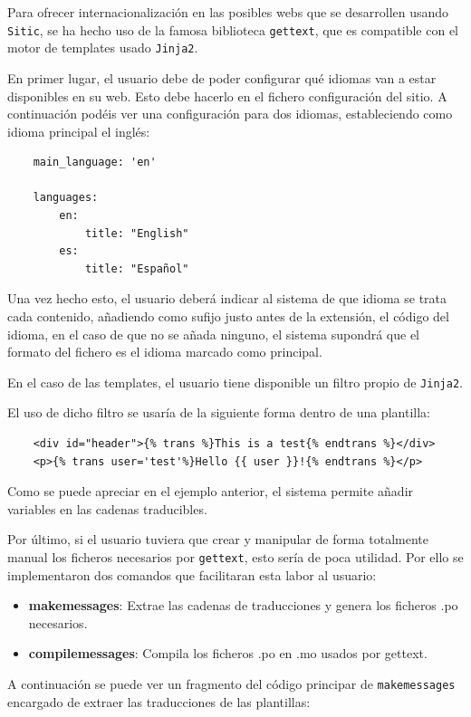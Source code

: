 Para ofrecer internacionalización en las posibles webs que se desarrollen usando \texttt{Sitic}, se ha hecho uso
de la famosa biblioteca \texttt{gettext}, que es compatible con el motor de templates usado \texttt{Jinja2}.

En primer lugar, el usuario debe de poder configurar qué idiomas van a estar disponibles en su web. Esto debe hacerlo
en el fichero configuración del sitio. A continuación podéis ver una configuración para dos idiomas, estableciendo como
idioma principal el inglés:

\begin{verbatim}
    main_language: 'en'

    languages:
        en:
            title: "English"
        es:
            title: "Español"
\end{verbatim}

Una vez hecho esto, el usuario deberá indicar al sistema de que idioma se trata cada contenido, añadiendo como sufijo
justo antes de la extensión, el código del idioma, en el caso de que no se añada ninguno, el sistema supondrá que
el formato del fichero es el idioma marcado como principal.

En el caso de las templates, el usuario tiene disponible un filtro propio de \texttt{Jinja2}.

El uso de dicho filtro se usaría de la siguiente forma dentro de una plantilla:
\begin{verbatim}
    <div id="header">{% trans %}This is a test{% endtrans %}</div>
    <p>{% trans user='test'%}Hello {{ user }}!{% endtrans %}</p>
\end{verbatim}

Como se puede apreciar en el ejemplo anterior, el sistema permite añadir variables en las cadenas 
traducibles.

Por último, si el usuario tuviera que crear y manipular de forma totalmente manual los ficheros
necesarios por \texttt{gettext}, esto sería de poca utilidad. Por ello se implementaron dos comandos
que facilitaran esta labor al usuario:

\begin{itemize}
	\item \textbf{makemessages}: Extrae las cadenas de traducciones y genera los ficheros .po necesarios.
	\item \textbf{compilemessages}: Compila los ficheros .po en .mo usados por gettext.
\end{itemize}

A continuación se puede ver un fragmento del código principar de \texttt{makemessages}
encargado de extraer las traducciones de las plantillas:

